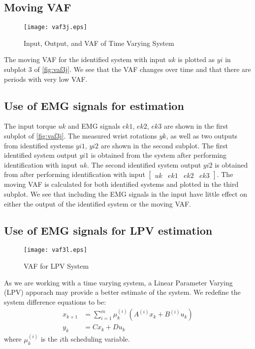 \documentclass[11pt,a4paper]{article}
\begin{document}
\subsection{Moving VAF}
\begin{figure}
    \centering
    \texttt{[image: vaf3j.eps]}
    \caption{Input, Output, and VAF of Time Varying System}
    \label{fig:vaf3j}
\end{figure}
The moving VAF for the identified system with input $uk$ is plotted as $yi$ in
subplot 3 of \autoref{fig:vaf3j}. We see that the VAF changes over time and
that there are periods with very low VAF.

\subsection{Use of EMG signals for estimation}
The input torque $uk$ and EMG signals $ek1$, $ek2$, $ek3$ are shown in the
first subplot of \autoref{fig:vaf3j}. The measured wrist rotations $yk$, as
well as two outputs from identified systems $yi1$, $yi2$ are shown in the
second subplot. The first identified system output $yi1$ is obtained from the
system after performing identification with input $uk$. The second identified
system output $yi2$ is obtained from after performing identification with input
$\begin{bmatrix} uk & ek1 & ek2 & ek3 \end{bmatrix}$. The moving VAF is
calculated for both identified systems and plotted in the third subplot. We see
that including the EMG signals in the input have little effect on either the
output of the identified system or the moving VAF.

\subsection{Use of EMG signals for LPV estimation}
\begin{figure}
    \centering
    \texttt{[image: vaf3l.eps]}
    \caption{VAF for LPV System}
    \label{fig:vaf3l}
\end{figure}
As we are working with a time varying system, a Linear Parameter Varying (LPV)
apporach may provide a better estimate of the system. We redefine the system
difference equations to be:
\begin{align}
    x_{k + 1} &= \sum_{i = 1}^m \mu_k^{(i)} (A^{(i)} x_k + B^{(i)} u_k) \\
    y_k &= C x_k + D u_k
\end{align}
where $\mu_k^{(i)}$ is the $i$th scheduling variable.
\end{document}

